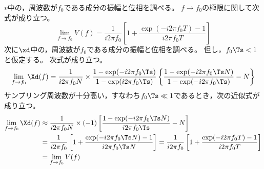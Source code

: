             $v$中の，周波数が$f_0$である成分の振幅と位相を調べる。
            $f\to f_0$の極限に関して次式が成り立つ。
            \[ \lim_{f\to f_0} V(f) = \frac{1}{i2\pi f_0}\left[1 + \frac{\exp(-i 2\pi f_0 T)-1}{i 2\pi f_0 T}\right] \]
            次に$\xd$中の，周波数が$f_0$である成分の振幅と位相を調べる。
            但し，$f_0\Ts < 1$と仮定する。
            次式が成り立つ。
            \[ \lim_{f\to f_0} \Xd(f) = \frac{1}{i 2\pi f_0 N}\times\frac{1-\exp(-i 2\pi f_0\Ts)}{1-\exp(i 2\pi f_0\Ts)}\left\{\frac{1-\exp(-i 2\pi f_0 \Ts N)}{1-\exp(-i 2\pi f_0 \Ts)} - N\right\} \]
            サンプリング周波数が十分高い，すなわち$f_0\Ts\ll 1$であるとき，次の近似式が成り立つ。
            \begin{align*}
                \lim_{f\to f_0} \Xd(f) &\approx \frac{1}{i 2\pi f_0 N}\times(-1)\left[\frac{1-\exp(-i 2\pi f_0 \Ts N)}{i 2\pi f_0 \Ts} - N\right] \\
                &= \frac{1}{i 2\pi f_0}\left[1 + \frac{\exp(-i 2\pi f_0 \Ts N)-1}{i 2\pi f_0 \Ts N}\right] = \frac{1}{i 2\pi f_0}\left[1 + \frac{\exp(-i 2\pi f_0 T)-1}{i 2\pi f_0 T}\right] \\
                &=  \lim_{f\to f_0} V(f)
            \end{align*}
